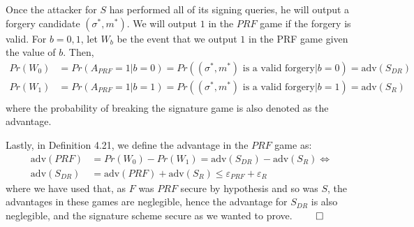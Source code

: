 Once the attacker for $S$ has performed all of its signing queries, he will output a forgery candidate $(\sigma^*, m^*)$.
We will output $1$ in the $PRF$ game if the forgery is valid.
For $b = 0,1$, let $W_b$ be the event that we output $1$ in the PRF game given the value of $b$. Then,
\begin{equation*}
    \begin{split}
        Pr(W_0) &= Pr(A_{PRF} = 1 | b = 0) = Pr((\sigma^*, m^*) \text{ is a valid forgery} | b = 0) = \text{adv}(S_{DR}) \\
        Pr(W_1) &= Pr(A_{PRF} = 1 | b = 1) = Pr((\sigma^*, m^*) \text{ is a valid forgery} | b = 1) = \text{adv}(S_{R}) \\
    \end{split}
\end{equation*}
where the probability of breaking the signature game is also denoted as the advantage.

Lastly, in Definition 4.21, we define the advantage in the $PRF$ game as:
\begin{equation*}
    \begin{split}
        \text{adv}(PRF) &= Pr(W_0) - Pr(W_1) = \text{adv}(S_{DR}) - \text{adv}(S_R) \Leftrightarrow \\
        \text{adv}(S_{DR}) &= \text{adv}(PRF) + \text{adv}(S_R) \leq \varepsilon_{PRF} + \varepsilon_{R}
    \end{split}
\end{equation*}
where we have used that, as $F$ was $PRF$ secure by hypothesis and so was $S$, the advantages in these games are neglegible, hence the advantage for $S_{DR}$ is also neglegible, and the signature scheme secure as we wanted to prove. \hfill $\qed$

